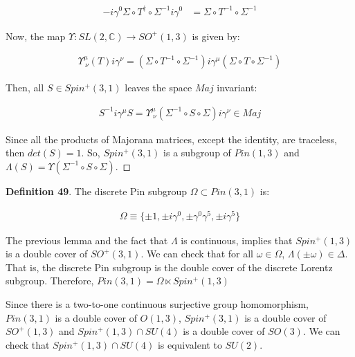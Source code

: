 \documentclass[11pt]{book}
\begin{document}
\begin{equation}\begin{aligned}
-i\gamma^0 \Sigma \circ T^\dagger
\circ \Sigma^{-1} i\gamma^0&=\Sigma \circ T^{-1}
\circ \Sigma^{-1}\end{aligned}\end{equation}

Now, the map \(\Upsilon:SL(2,\mathbb{C})\to
SO^+(1,3)\) is given by:

\begin{equation}\begin{aligned}
\Upsilon^{\mu}_{\ \nu}(T)i\gamma^\nu = (\Sigma \circ T^{-1}
\circ \Sigma^{-1}) i\gamma^\mu (\Sigma\circ T \circ \Sigma^{-1})\end{aligned}\end{equation}

Then, all \(S\in Spin^+(3,1)\) leaves the space \(Maj\) invariant:

\begin{equation}\begin{aligned}
S^{-1} i\gamma^\mu S=
\Upsilon^{\mu}_{\ \nu}(\Sigma^{-1}\circ S \circ \Sigma)i\gamma^\nu
\in Maj\end{aligned}\end{equation}

Since all the products of Majorana matrices, except the identity, are
traceless, then \(det(S)=1\). So, \(Spin^+(3,1)\) is a subgroup of
\(Pin(1,3)\) and
\(\Lambda(S)=\Upsilon(\Sigma^{-1}\circ S \circ \Sigma)\).~◻

\textbf{Definition 49}. The discrete Pin subgroup
\(\Omega\subset Pin(3,1)\) is:

\begin{equation}\begin{aligned}
\Omega \equiv \{\pm 1,\pm i\gamma^0,\pm \gamma^0\gamma^5,\pm
i\gamma^5\}\end{aligned}\end{equation}

The previous lemma and the fact that \(\Lambda\) is continuous, implies
that \(Spin^+(1,3)\) is a double cover of \(SO^+(3,1)\). We can check
that for all \(\omega\in \Omega\), \(\Lambda(\pm \omega)\in
\Delta\). That is, the discrete Pin subgroup is the double cover of the
discrete Lorentz subgroup. Therefore,
\(Pin(3,1)=\Omega \ltimes Spin^+(1,3)\)

Since there is a two-to-one continuous surjective group homomorphism,
\(Pin(3,1)\) is a double cover of \(O(1,3)\), \(Spin^+(3,1)\) is a
double cover of \(SO^+(1,3)\) and \(Spin^+(1,3)\cap SU(4)\) is a double
cover of \(SO(3)\). We can check that \(Spin^+(1,3)\cap SU(4)\) is
equivalent to \(SU(2)\).
\end{document}
